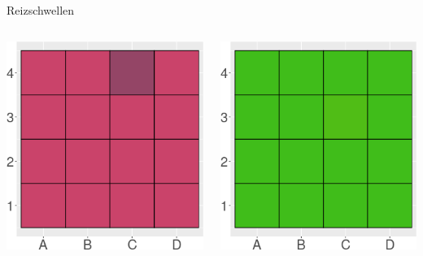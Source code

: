 \documentclass[aspectratio=169]{beamer}
\begin{document}
\begin{frame}{Reizschwellen}
\begin{itemize}
\begin{columns}[c]
    
    \begin{column}{3.2cm}
    \includegraphics[width=\textwidth]{color_test_screenshot.png}
    
    \end{column}
    
    
    \begin{column}{3.2cm}
    \includegraphics[width=\textwidth]{color_test_screenshot_2.png}
    

\end{column}
\end{columns}
\end{itemize}
\end{frame}
\end{document}
